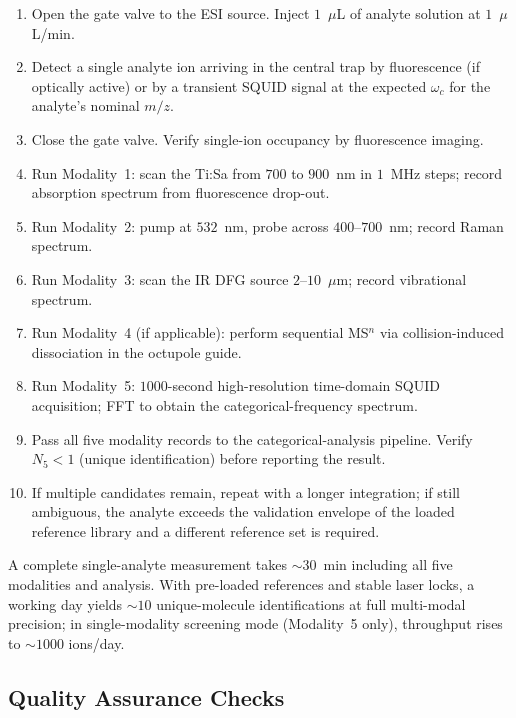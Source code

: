 \begin{enumerate}[leftmargin=1.5em]
    \item Open the gate valve to the ESI source. Inject $1$~$\mu$L of analyte solution at $1$~$\mu$L/min.
    \item Detect a single analyte ion arriving in the central trap by fluorescence (if optically active) or by a transient SQUID signal at the expected $\omega_c$ for the analyte's nominal $m/z$.
    \item Close the gate valve. Verify single-ion occupancy by fluorescence imaging.
    \item Run Modality~1: scan the Ti:Sa from $700$ to $900$~nm in $1$~MHz steps; record absorption spectrum from fluorescence drop-out.
    \item Run Modality~2: pump at $532$~nm, probe across $400$--$700$~nm; record Raman spectrum.
    \item Run Modality~3: scan the IR DFG source $2$--$10$~$\mu$m; record vibrational spectrum.
    \item Run Modality~4 (if applicable): perform sequential MS$^n$ via collision-induced dissociation in the octupole guide.
    \item Run Modality~5: $1000$-second high-resolution time-domain SQUID acquisition; FFT to obtain the categorical-frequency spectrum.
    \item Pass all five modality records to the categorical-analysis pipeline. Verify $N_5 < 1$ (unique identification) before reporting the result.
    \item If multiple candidates remain, repeat with a longer integration; if still ambiguous, the analyte exceeds the validation envelope of the loaded reference library and a different reference set is required.
\end{enumerate}

A complete single-analyte measurement takes $\sim 30$~min including all five modalities and analysis. With pre-loaded references and stable laser locks, a working day yields $\sim 10$ unique-molecule identifications at full multi-modal precision; in single-modality screening mode (Modality~5 only), throughput rises to $\sim 1000$ ions/day.

\subsection{Quality Assurance Checks}
\label{subsec:qa}

